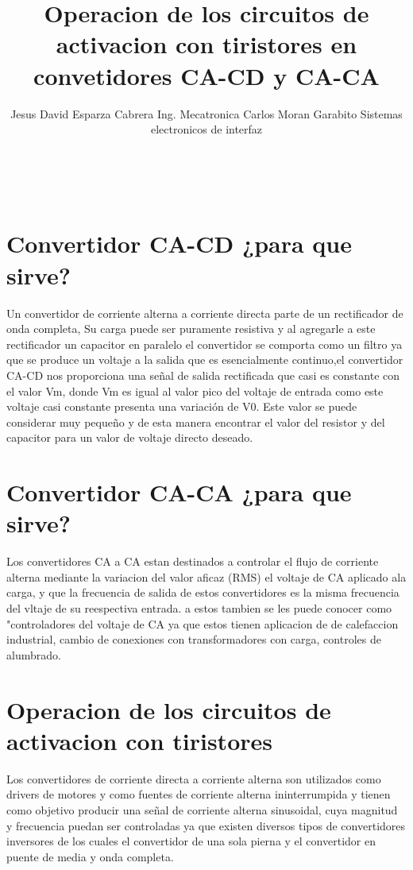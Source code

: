 \documentclass[12pt]{article}
\author{Jesus David Esparza Cabrera
Ing. Mecatronica
Carlos Moran Garabito
Sistemas electronicos de interfaz}
\title{Operacion de los circuitos de activacion con tiristores en convetidores CA-CD y CA-CA}
\begin{document}
\maketitle\

\newpage
\maketitle\section{Convertidor CA-CD ¿para que sirve?}
Un  convertidor  de  corriente  alterna  a  corriente  directa  parte  de  un  rectificador  de  onda  completa,  Su  carga  puede  ser  puramente  resistiva y al  agregarle  a  este  rectificador  un  capacitor en paralelo el convertidor se comporta como un filtro ya que se produce un voltaje a la salida que es esencialmente continuo,el  convertidor  CA-CD  nos  proporciona  una  señal  de  salida  rectificada que casi es constante con el valor  Vm,  donde  Vm  es  igual  al  valor  pico  del  voltaje  de  entrada como este  voltaje  casi  constante  presenta  una  variación  de  V0.  Este  valor  se  puede  considerar  muy  pequeño  y  de  esta  manera  encontrar  el  valor  del  resistor  y  del capacitor para un valor de voltaje directo deseado. 




\maketitle\section{Convertidor CA-CA ¿para que sirve?}
Los convertidores CA a CA estan destinados a controlar el flujo de corriente alterna mediante la variacion del valor aficaz (RMS) el voltaje de CA aplicado ala carga, y que la frecuencia de salida de estos convertidores es la misma frecuencia del vltaje de su reespectiva entrada.
a estos tambien se les puede conocer como "controladores del voltaje de CA ya que estos tienen aplicacion de de calefaccion industrial, cambio de conexiones con transformadores con carga, controles de alumbrado.

\newpage



\maketitle\section{Operacion de los circuitos de activacion con tiristores}
Los  convertidores  de  corriente  directa  a  corriente  alterna  son  utilizados  como  drivers  de  motores  y  como  fuentes  de  corriente  alterna  ininterrumpida  y  tienen  como  objetivo  producir  una  señal  de  corriente  alterna  sinusoidal,  cuya  magnitud  y  frecuencia  puedan  ser  controladas ya que existen  diversos  tipos  de  convertidores  inversores  de  los  cuales  el  convertidor  de  una  sola  pierna  y  el  convertidor  en  puente  de  media  y  onda  completa.
\end{document}
